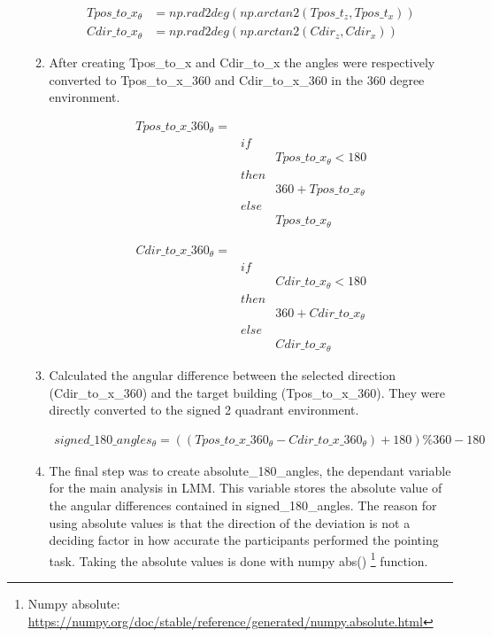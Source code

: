 \begin{enumerate}
\begin{enumerate}
		\begin{align*}
			Tpos\_to\_x_{\theta} & = np.rad2deg(np.arctan2(Tpos\_t_{z}, Tpos\_t_{x})) \\
			Cdir\_to\_x_{\theta} & = np.rad2deg(np.arctan2(Cdir_{z}, Cdir_{x}))
		\end{align*}
		
		\item After creating {\emphasize Tpos\_to\_x} and {\emphasize Cdir\_to\_x} the angles were respectively converted to {\emphasize Tpos\_to\_x\_360} and {\emphasize Cdir\_to\_x\_360} in the 360 degree environment.

		\begin{align*}
			Tpos\_to\_x\_360_{\theta} = & \\
			& if & \\
			&& Tpos\_to\_x_{\theta} < 180 \\
			& then & \\
			&& 360 + Tpos\_to\_x_{\theta} \\
			& else & \\
			&& Tpos\_to\_x_{\theta}
		\end{align*}
	
		\begin{align*}
			Cdir\_to\_x\_360_{\theta} = & \\
			& if & \\
			&& Cdir\_to\_x_{\theta} < 180 \\
			& then & \\
			&& 360 + Cdir\_to\_x_{\theta} \\
			& else & \\
			&& Cdir\_to\_x_{\theta}
		\end{align*}
		
		\item Calculated the angular difference between the selected direction {\emphasize (Cdir\_to\_x\_360)} and the target building {\emphasize (Tpos\_to\_x\_360)}. They were directly converted to the signed 2 quadrant environment.
		
		\begin{align*}
			signed\_180\_angles_{\theta} = ((Tpos\_to\_x\_360_{\theta} - Cdir\_to\_x\_360_{\theta}) + 180) \% 360 - 180
		\end{align*}
	
		\item The final step was to create {\emphasize absolute\_180\_angles}, the dependant variable for the main analysis in LMM. This variable stores the absolute value of the angular differences contained in {\emphasize signed\_180\_angles}. The reason for using absolute values is that the direction of the deviation is not a deciding factor in how accurate the participants performed the pointing task. Taking the absolute values is done with numpy abs() \footnote{Numpy absolute: \href{https://numpy.org/doc/stable/reference/generated/numpy.absolute.html}{https://numpy.org/doc/stable/reference/generated/numpy.absolute.html}} function.
		

\end{enumerate}
\end{enumerate}
